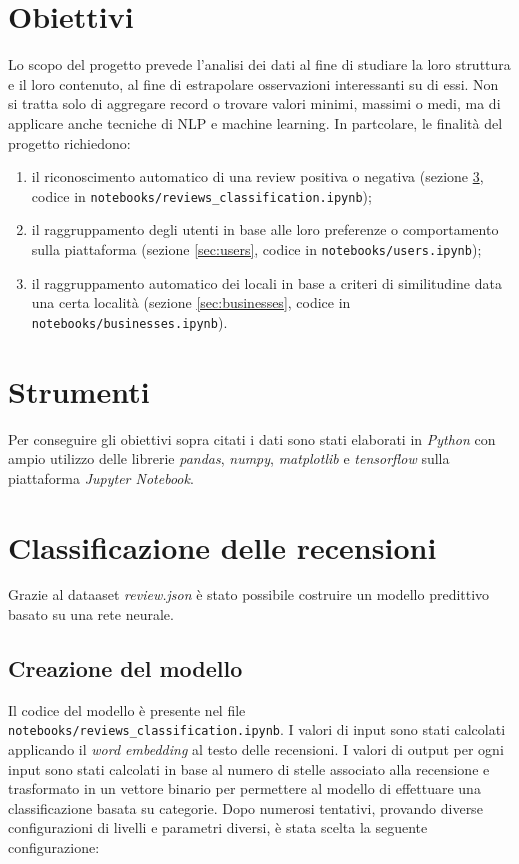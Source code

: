 \documentclass[12pt]{article}
\begin{document}
\section{Obiettivi}
Lo scopo del progetto prevede l'analisi dei dati al fine di studiare la loro struttura e il loro contenuto, al fine di estrapolare osservazioni interessanti su di essi. Non si tratta solo di aggregare record o trovare valori minimi, massimi o medi, ma di applicare anche tecniche di NLP e machine learning. In partcolare, le finalità del progetto richiedono:
\begin{enumerate}[label=T\arabic*)]
\item il riconoscimento automatico di una review positiva o negativa (sezione \ref{sec:reviews}, codice in \texttt{notebooks/reviews\_classification.ipynb});
\item il raggruppamento degli utenti in base alle loro preferenze o comportamento sulla piattaforma (sezione \ref{sec:users}, codice in \texttt{notebooks/users.ipynb});
\item il raggruppamento automatico dei locali in base a criteri di similitudine data una certa località (sezione \ref{sec:businesses}, codice in \texttt{notebooks/businesses.ipynb}).
\end{enumerate}

\section{Strumenti}
Per conseguire gli obiettivi sopra citati i dati sono stati elaborati in \textit{Python} con ampio utilizzo delle librerie \textit{pandas}, \textit{numpy}, \textit{matplotlib} e \textit{tensorflow} sulla piattaforma \textit{Jupyter Notebook}.

\section{Classificazione delle recensioni}
\label{sec:reviews}
Grazie al dataaset \textit{review.json} è stato possibile costruire un modello predittivo basato su una rete neurale.

\subsection{Creazione del modello}
Il codice del modello è presente nel file \texttt{notebooks/reviews\_classification.ipynb}. \newline
I valori di input sono stati calcolati applicando il \textit{word embedding} al testo delle recensioni. I valori di output per ogni input sono stati calcolati in base al numero di stelle associato alla recensione e trasformato in un vettore binario per permettere al modello di effettuare una classificazione basata su categorie. \newline
Dopo numerosi tentativi, provando diverse configurazioni di livelli e parametri diversi, è stata scelta la seguente configurazione:

\end{document}
